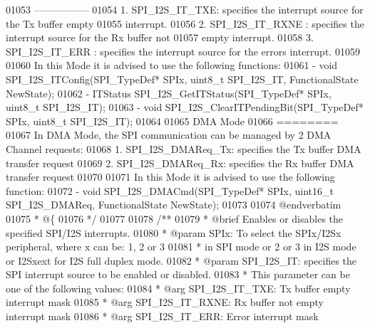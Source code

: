 \begin{DoxyCode}
01053 \textcolor{comment}{  -----------------}
01054 \textcolor{comment}{     1. SPI\_I2S\_IT\_TXE: specifies the interrupt source for the Tx buffer empty }
01055 \textcolor{comment}{                        interrupt.  }
01056 \textcolor{comment}{     2. SPI\_I2S\_IT\_RXNE : specifies the interrupt source for the Rx buffer not }
01057 \textcolor{comment}{                          empty interrupt.}
01058 \textcolor{comment}{     3. SPI\_I2S\_IT\_ERR : specifies the interrupt source for the errors interrupt.}
01059 \textcolor{comment}{}
01060 \textcolor{comment}{  In this Mode it is advised to use the following functions:}
01061 \textcolor{comment}{     - void SPI\_I2S\_ITConfig(SPI\_TypeDef* SPIx, uint8\_t SPI\_I2S\_IT, FunctionalState NewState);}
01062 \textcolor{comment}{     - ITStatus SPI\_I2S\_GetITStatus(SPI\_TypeDef* SPIx, uint8\_t SPI\_I2S\_IT);}
01063 \textcolor{comment}{     - void SPI\_I2S\_ClearITPendingBit(SPI\_TypeDef* SPIx, uint8\_t SPI\_I2S\_IT);}
01064 \textcolor{comment}{}
01065 \textcolor{comment}{  DMA Mode}
01066 \textcolor{comment}{  ========}
01067 \textcolor{comment}{  In DMA Mode, the SPI communication can be managed by 2 DMA Channel requests:}
01068 \textcolor{comment}{     1. SPI\_I2S\_DMAReq\_Tx: specifies the Tx buffer DMA transfer request}
01069 \textcolor{comment}{     2. SPI\_I2S\_DMAReq\_Rx: specifies the Rx buffer DMA transfer request}
01070 \textcolor{comment}{}
01071 \textcolor{comment}{  In this Mode it is advised to use the following function:}
01072 \textcolor{comment}{    - void SPI\_I2S\_DMACmd(SPI\_TypeDef* SPIx, uint16\_t SPI\_I2S\_DMAReq, FunctionalState NewState);}
01073 \textcolor{comment}{}
01074 \textcolor{comment}{@endverbatim}
01075 \textcolor{comment}{  * @\{}
01076 \textcolor{comment}{  */}
01077 
01078 \textcolor{comment}{/**}
01079 \textcolor{comment}{  * @brief  Enables or disables the specified SPI/I2S interrupts.}
01080 \textcolor{comment}{  * @param  SPIx: To select the SPIx/I2Sx peripheral, where x can be: 1, 2 or 3 }
01081 \textcolor{comment}{  *         in SPI mode or 2 or 3 in I2S mode or I2Sxext for I2S full duplex mode. }
01082 \textcolor{comment}{  * @param  SPI\_I2S\_IT: specifies the SPI interrupt source to be enabled or disabled. }
01083 \textcolor{comment}{  *          This parameter can be one of the following values:}
01084 \textcolor{comment}{  *            @arg SPI\_I2S\_IT\_TXE: Tx buffer empty interrupt mask}
01085 \textcolor{comment}{  *            @arg SPI\_I2S\_IT\_RXNE: Rx buffer not empty interrupt mask}
01086 \textcolor{comment}{  *            @arg SPI\_I2S\_IT\_ERR: Error interrupt mask}

\end{DoxyCode}
